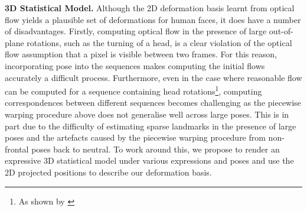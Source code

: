 \textbf{3D Statistical Model.}
Although the 2D deformation basis learnt from optical flow yields a plausible
set of deformations for human faces, it does have a number of disadvantages.
Firstly, computing optical flow in the presence of large out-of-plane rotations,
such as the turning of a head, is a clear violation of the optical flow assumption
that a pixel is visible between two frames. For this reason, incorporating pose into the
sequences makes computing the initial flows accurately a difficult process.
Furthermore, even in the case where reasonable flow can be computed for a 
sequence containing head rotations\footnote{As shown by \citet{garg2013dense}},
computing correspondences between different sequences becomes challenging
as the piecewise warping procedure above does not generalise well across large
poses. This is in part due to the difficulty of estimating sparse landmarks
in the presence of large poses and the artefacts caused by the piecewise warping
procedure from non-frontal poses back to neutral.
To work around this, we propose to render an expressive 3D statistical model
under various expressions and poses and use the 2D projected positions
to describe our deformation basis. 

